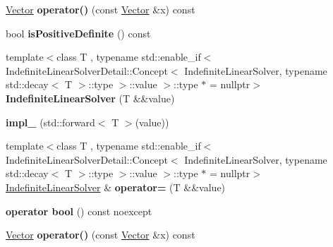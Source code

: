 \begin{DoxyCompactItemize}
\item 
\hypertarget{classSpacy_1_1IndefiniteLinearSolver_a150a854c97a44c1c53c4aa071e1b8b12}{\hyperlink{classSpacy_1_1Vector}{Vector} {\bfseries operator()} (const \hyperlink{classSpacy_1_1Vector}{Vector} \&x) const }\label{classSpacy_1_1IndefiniteLinearSolver_a150a854c97a44c1c53c4aa071e1b8b12}

\item 
\hypertarget{classSpacy_1_1IndefiniteLinearSolver_a04191e6ed2c8cd54870c79a919dcae39}{bool {\bfseries is\-Positive\-Definite} () const }\label{classSpacy_1_1IndefiniteLinearSolver_a04191e6ed2c8cd54870c79a919dcae39}

\item 
\hypertarget{classSpacy_1_1IndefiniteLinearSolver_af60b1bb12efcf0daccfb48122867ea96}{{\footnotesize template$<$class T , typename std\-::enable\-\_\-if$<$ Indefinite\-Linear\-Solver\-Detail\-::\-Concept$<$ Indefinite\-Linear\-Solver, typename std\-::decay$<$ T $>$\-::type $>$\-::value $>$\-::type $\ast$  = nullptr$>$ }\\{\bfseries Indefinite\-Linear\-Solver} (T \&\&value)}\label{classSpacy_1_1IndefiniteLinearSolver_af60b1bb12efcf0daccfb48122867ea96}

\item 
\hypertarget{classSpacy_1_1IndefiniteLinearSolver_a0f77940a36c6bcd65509a0cad183884b}{{\bfseries impl\-\_\-} (std\-::forward$<$ T $>$(value))}\label{classSpacy_1_1IndefiniteLinearSolver_a0f77940a36c6bcd65509a0cad183884b}

\item 
\hypertarget{classSpacy_1_1IndefiniteLinearSolver_a6ed5d50bdf25e31ea81a3aaa0c35dd8e}{{\footnotesize template$<$class T , typename std\-::enable\-\_\-if$<$ Indefinite\-Linear\-Solver\-Detail\-::\-Concept$<$ Indefinite\-Linear\-Solver, typename std\-::decay$<$ T $>$\-::type $>$\-::value $>$\-::type $\ast$  = nullptr$>$ }\\\hyperlink{classSpacy_1_1IndefiniteLinearSolver}{Indefinite\-Linear\-Solver} \& {\bfseries operator=} (T \&\&value)}\label{classSpacy_1_1IndefiniteLinearSolver_a6ed5d50bdf25e31ea81a3aaa0c35dd8e}

\item 
\hypertarget{classSpacy_1_1IndefiniteLinearSolver_a4ef57ec75c5f8cf611a99e80fe1a492d}{{\bfseries operator bool} () const noexcept}\label{classSpacy_1_1IndefiniteLinearSolver_a4ef57ec75c5f8cf611a99e80fe1a492d}

\item 
\hypertarget{classSpacy_1_1IndefiniteLinearSolver_a150a854c97a44c1c53c4aa071e1b8b12}{\hyperlink{classSpacy_1_1Vector}{Vector} {\bfseries operator()} (const \hyperlink{classSpacy_1_1Vector}{Vector} \&x) const }\label{classSpacy_1_1IndefiniteLinearSolver_a150a854c97a44c1c53c4aa071e1b8b12}


\end{DoxyCompactItemize}
